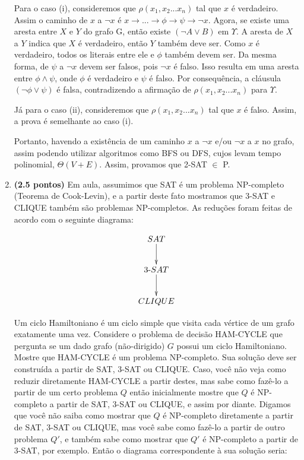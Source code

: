 \documentclass[12pt]{article}
\begin{document}
\begin{enumerate}
{\begin{enumerate}
        Para o caso (i), consideremos que $\rho(x_1,x_2...x_n)$ tal que $x$ é verdadeiro. Assim o caminho de $x$ a $\neg x$ é $x \rightarrow ... \rightarrow \phi \rightarrow \psi \rightarrow \neg x$. Agora, se existe uma aresta entre $X$ e $Y$ do grafo G, então existe $(\neg A \lor B)$ em $\Upsilon$. A aresta de $X$ a $Y$ indica que $X$ é verdadeiro, então $Y$ também deve ser. Como $x$ é verdadeiro, todos os literais entre ele e $\phi$ também devem ser. Da mesma forma, de $\psi$ a $\neg x$ devem ser falsos, pois $\neg x$ é falso. Isso resulta em uma aresta entre $\phi \land \psi$, onde $\phi$ é verdadeiro e $\psi$ é falso. Por consequência, a cláusula $(\neg \phi \lor \psi)$ é falsa, contradizendo a afirmação de $\rho(x_1,x_2...x_n)$ para $\Upsilon$.
        
        Já para o caso (ii), consideremos que $\rho(x_1,x_2...x_n)$ tal que $x$ é falso. Assim, a prova é semelhante ao caso (i).
    \end{enumerate}
    
    Portanto, havendo a existência de um caminho $x$ a $\neg x$ e/ou $\neg x$ a $x$ no grafo, assim podendo utilizar algoritmos como BFS ou DFS, cujos levam tempo polinomial, $\Theta(V + E)$. Assim, provamos que 2-SAT $\in$ P.
  }
  
\item {\bf (2.5 pontos)} Em aula, assumimos que SAT é um problema
  NP-completo (Teorema de Cook-Levin), e a partir deste fato mostramos
  que 3-SAT e CLIQUE também são problemas NP-completos. As reduções
  foram feitas de acordo com o seguinte diagrama:

  $$\xymatrix{
    SAT \ar[d] \\
    3\mbox{-}SAT \ar[d] \\
    CLIQUE 
  }$$
  
  Um ciclo Hamiltoniano é um ciclo simple que visita cada vértice de
  um grafo exatamente uma vez. Considere o problema de decisão
  HAM-CYCLE que pergunta se um dado grafo (não-dirigido) $G$ possui um
  ciclo Hamiltoniano. Mostre que HAM-CYCLE é um problema
  NP-completo. Sua solução deve ser construída a partir de SAT, 3-SAT
  ou CLIQUE. Caso, você não veja como reduzir diretamente HAM-CYCLE a
  partir destes, mas sabe como fazê-lo a partir de um certo problema
  $Q$ então inicialmente mostre que $Q$ é NP-completo a partir de SAT,
  3-SAT ou CLIQUE, e assim por diante. Digamos que você não saiba como
  mostrar que $Q$ é NP-completo diretamente a partir de SAT, 3-SAT ou
  CLIQUE, mas você sabe como fazê-lo a partir de outro problema $Q'$,
  e também sabe como mostrar que $Q'$ é NP-completo a partir de 3-SAT,
  por exemplo. Então o diagrama correspondente à sua solução seria:


\end{enumerate}
\end{document}
